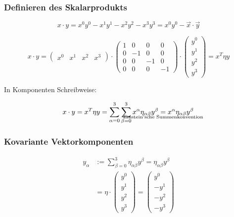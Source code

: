 \documentclass[a4paper, 11pt]{article}
\numberwithin{equation}{section}
\begin{document}
\subsubsection*{Definieren des Skalarprodukts}

\begin{equation}
x \cdot y = x^0y^0 - x^1y^1-x^2y^2-x^3y^3 = x^0y^0- \vec{x} \cdot \vec{y}
\end{equation}

\begin{equation}\label{glg:1_skalarprodukt4DimRaumZeit}
x \cdot y = \begin{pmatrix}x^0 & x^1 & x^2 & x^3\end{pmatrix} \cdot
\begin{pmatrix} 1 & 0 & 0 &0\\ 0 & -1 & 0 & 0 \\ 0 & 0 & -1 & 0 \\ 0& 0 & 0 & -1\end{pmatrix} \cdot \begin{pmatrix}
y^0 \\ y^1 \\ y^2 \\y^3\end{pmatrix} = x^T \eta y
\end{equation}


In Komponenten Schreibweise:

\begin{equation}
x \cdot y  = x^T \eta y = \sum^3_{\alpha = 0} \sum^3_{\beta = 0} x^\alpha \eta_{\alpha \beta} y^\beta \underset{\mathclap{\text{Einstein'sche  Summenkonvention}}}{=} x^\alpha \eta_{\alpha \beta} y^\beta
\end{equation}

\subsubsection*{Kovariante Vektorkomponenten}

\begin{equation}
\begin{aligned}
y_\alpha &:= \sum^3_{\beta=0} \eta_{\alpha \beta} y^\beta = \eta_{\alpha \beta} y^\beta\\
&= \eta \cdot \begin{pmatrix}y^0 \\ y^1 \\ y^2 \\ y^3\end{pmatrix} = \begin{pmatrix}y^0 \\ -y^1 \\ -y^2 \\ -y^3\end{pmatrix} 
\end{aligned}
\end{equation}
\end{document}
